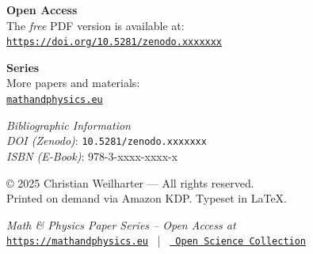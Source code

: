\documentclass[12pt,oneside]{scrartcl}
\newcommand{\PaperDOI}{\emph{DOI (Zenodo)}: \texttt{10.5281/zenodo.xxxxxxx}}
\newcommand{\PaperISBNPDF}{\emph{ISBN (Print)}: 978-3-xxxx-xxxx-x}
\newcommand{\PaperISBNEPUB}{\emph{ISBN (E-Book)}: 978-3-xxxx-xxxx-x}
\begin{document}
	
	\noindent
	\textbf{Open Access}\\
	The \emph{free} PDF version is available at:\\[2pt]
	\href{https://doi.org/10.5281/zenodo.xxxxxxx}{\texttt{https://doi.org/10.5281/zenodo.xxxxxxx}}
	
	\vspace{0.8cm}
	
	\noindent
	\textbf{Series}\\
	More papers and materials:\\
	\href{https://mathandphysics.eu}{\texttt{mathandphysics.eu}}
	
	\vfill
	
	\noindent
	\small
	\textit{Bibliographic Information}\\
	\PaperDOI\\
	\PaperISBNEPUB
	
	\vspace{0.8cm}
	
	\noindent
	\footnotesize
	© 2025 Christian Weilharter — All rights reserved.\\
	Printed on demand via Amazon KDP. Typeset in \LaTeX.
	
	\vfill
	\begin{center}
		\small
		\textit{Math \& Physics Paper Series – Open Access at}\\[2pt]
		\href{https://mathandphysics.eu}{\texttt{https://mathandphysics.eu}} \, | \,
		\href{https://zenodo.org/communities/christian-copilot/records?q=&l=list&p=1&s=10&sort=newest}{\texttt{ Open Science Collection}}
		
	\end{center}
	
\end{document}
